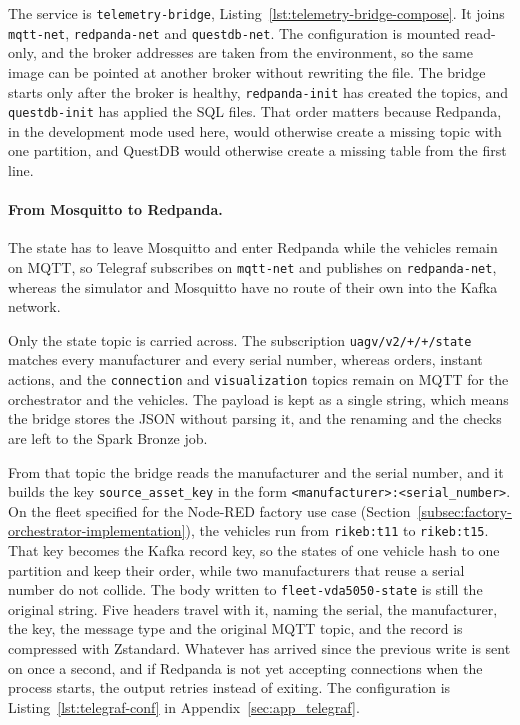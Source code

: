 The service is \texttt{telemetry-bridge}, Listing~\ref{lst:telemetry-bridge-compose}. It joins \texttt{mqtt-net}, \texttt{redpanda-net} and \texttt{questdb-net}. The configuration is mounted read-only, and the broker addresses are taken from the environment, so the same image can be pointed at another broker without rewriting the file. The bridge starts only after the broker is healthy, \texttt{redpanda-init} has created the topics, and \texttt{questdb-init} has applied the SQL files. That order matters because Redpanda, in the development mode used here, would otherwise create a missing topic with one partition, and QuestDB would otherwise create a missing table from the first line.

\paragraph{From Mosquitto to Redpanda.}
The state has to leave Mosquitto and enter Redpanda while the vehicles remain on MQTT, so Telegraf subscribes on \texttt{mqtt-net} and publishes on \texttt{redpanda-net}, whereas the simulator and Mosquitto have no route of their own into the Kafka network.

Only the state topic is carried across. The subscription \texttt{uagv/v2/+/+/state} matches every manufacturer and every serial number, whereas orders, instant actions, and the \texttt{connection} and \texttt{visualization} topics remain on MQTT for the orchestrator and the vehicles. The payload is kept as a single string, which means the bridge stores the JSON without parsing it, and the renaming and the checks are left to the Spark Bronze job.

From that topic the bridge reads the manufacturer and the serial number, and it builds the key \texttt{source\_asset\_key} in the form \texttt{<manufacturer>:<serial\_number>}. On the fleet specified for the Node-RED factory use case (Section~\ref{subsec:factory-orchestrator-implementation}), the vehicles run from \texttt{rikeb:t11} to \texttt{rikeb:t15}. That key becomes the Kafka record key, so the states of one vehicle hash to one partition and keep their order, while two manufacturers that reuse a serial number do not collide. The body written to \texttt{fleet-vda5050-state} is still the original string. Five headers travel with it, naming the serial, the manufacturer, the key, the message type and the original MQTT topic, and the record is compressed with Zstandard. Whatever has arrived since the previous write is sent on once a second, and if Redpanda is not yet accepting connections when the process starts, the output retries instead of exiting. The configuration is Listing~\ref{lst:telegraf-conf} in Appendix~\ref{sec:app_telegraf}.

